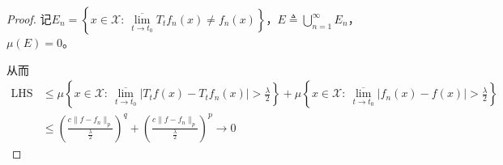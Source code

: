 \begin{proof}
    记$E_n = \left\lbrace x\in \mathscr{X}:\ \overline{\lim\limits_{t\to t_0}} T_t f_n(x) \neq f_n(x)\right\rbrace$，$E\triangleq\bigcup\limits_{n=1}^{\infty} E_n$，$\mu(E)=0$。

    从而
    \begin{align*}
        \operatorname{LHS} &\leqslant \mu\left\lbrace x\in\mathscr{X}:\ \overline{\lim\limits_{t\to t_0}} |T_tf(x) - T_tf_n(x)| > \frac{\lambda}{2} \right\rbrace + \mu\left\lbrace x\in\mathscr{X}:\ \overline{\lim\limits_{t\to t_0}} |f_n(x) - f(x)| > \frac{\lambda}{2} \right\rbrace \\
        & \leqslant \left( \frac{c \|f-f_n\|_p}{\frac{\lambda}{2}}\right)^q + \left( \frac{c \|f-f_n\|_p}{\frac{\lambda}{2}}\right)^p \to 0
    \end{align*}
\end{proof}

